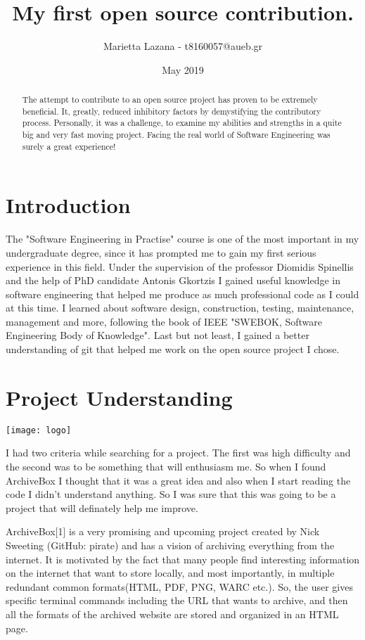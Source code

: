 \documentclass{article}
\title{My first open source contribution.}
\author{Marietta Lazana - t8160057@aueb.gr}
\date{May 2019}
\begin{document}
\maketitle

\begin{abstract}
The attempt to contribute to an open source project has proven to be extremely beneficial. It, greatly, reduced inhibitory factors by demystifying the contributory process. Personally, it was a challenge, to examine my abilities and strengths in a quite big and very fast moving project. Facing the real world of Software Engineering was surely a great experience!
  
\end{abstract}

\section*{Introduction}
The "Software Engineering in Practise" course is one of the most important in my undergraduate degree, since it has prompted me to gain my first serious experience in this field. Under the supervision of the professor Diomidis Spinellis and the help of PhD candidate Antonis Gkortzis I gained useful knowledge in software engineering that helped me produce as much professional code as I could at this time. I learned about software design, construction, testing, maintenance, management and more, following the book of IEEE "SWEBOK, Software Engineering  Body of Knowledge". Last but not least, I gained a better understanding of git that helped me work on the open source project I chose.

\section{Project Understanding}

\texttt{[image: logo]}

I had two criteria while searching for a project. The first was high difficulty and the second was to be something that will enthusiasm me. So when I found ArchiveBox I thought that it was a great idea and also when I start reading the code I didn't understand anything. So I was sure that this was going to be a project that will definately help me improve.

ArchiveBox[1] is a very promising and upcoming project created by Nick Sweeting (GitHub: pirate) and has a vision of archiving everything from the internet. It is motivated by the fact that many people find interesting information on the internet that want to store locally, and most importantly, in multiple redundant common formats(HTML, PDF, PNG, WARC etc.). So, the user gives specific terminal commands including the URL that wants to archive, and then all the formats of the archived website are stored and organized in an HTML page.
\end{document}
